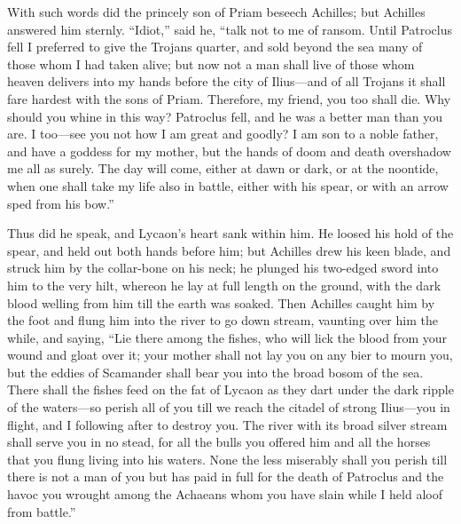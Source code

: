 With such words did the princely son of Priam beseech Achilles; but
Achilles answered him sternly. “Idiot,” said he, “talk not to me of
ransom. Until Patroclus fell I preferred to give the Trojans quarter, and
sold beyond the sea many of those whom I had taken alive; but now not a
man shall live of those whom heaven delivers into my hands before the city
of Ilius—and of all Trojans it shall fare hardest with the sons of
Priam. Therefore, my friend, you too shall die. Why should you whine in
this way? Patroclus fell, and he was a better man than you are. I too—see
you not how I am great and goodly? I am son to a noble father, and have a
goddess for my mother, but the hands of doom and death overshadow me all
as surely. The day will come, either at dawn or dark, or at the noontide,
when one shall take my life also in battle, either with his spear, or with
an arrow sped from his bow.”

Thus did he speak, and Lycaon’s heart sank within him. He loosed his hold
of the spear, and held out both hands before him; but Achilles drew his
keen blade, and struck him by the collar-bone on his neck; he plunged his
two-edged sword into him to the very hilt, whereon he lay at full length
on the ground, with the dark blood welling from him till the earth was
soaked. Then Achilles caught him by the foot and flung him into the river
to go down stream, vaunting over him the while, and saying, “Lie there
among the fishes, who will lick the blood from your wound and gloat over
it; your mother shall not lay you on any bier to mourn you, but the eddies
of Scamander shall bear you into the broad bosom of the sea. There shall
the fishes feed on the fat of Lycaon as they dart under the dark ripple of
the waters—so perish all of you till we reach the citadel of strong
Ilius—you in flight, and I following after to destroy you. The river
with its broad silver stream shall serve you in no stead, for all the
bulls you offered him and all the horses that you flung living into his
waters. None the less miserably shall you perish till there is not a man
of you but has paid in full for the death of Patroclus and the havoc you
wrought among the Achaeans whom you have slain while I held aloof from
battle.”


